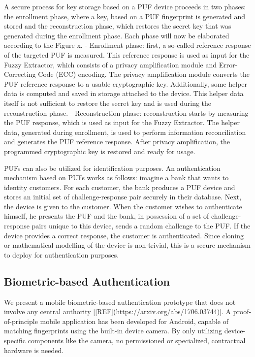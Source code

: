\documentclass[USenglish]{article}
\begin{document}
A secure process for key storage based on a PUF device proceeds in two phases: the enrollment phase, where a key, based on a PUF fingerprint is generated and stored and the reconstruction phase, which restores the secret key that was generated during the enrollment phase.
Each phase will now be elaborated according to the Figure x.
- Enrollment phase: first, a so-called reference response of the targeted PUF is measured. This reference response is used as input for the Fuzzy Extractor, which consists of a privacy amplification module and Error-Correcting Code (ECC) encoding. The privacy amplification module converts the PUF reference response to a usable cryptographic key. Additionally, some helper data is computed and saved in storage attached to the device. This helper data itself is not sufficient to restore the secret key and is used during the reconstruction phase.
- Reconstruction phase: reconstruction starts by measuring the PUF response, which is used as input for the Fuzzy Extractor. The helper data, generated during enrollment, is used to perform information reconciliation and generates the PUF reference response. After privacy amplification, the programmed cryptographic key is restored and ready for usage.

PUFs can also be utilized for identification purposes.
An authentication mechanism based on PUFs works as follows: imagine a bank that wants to identity customers.
For each customer, the bank produces a PUF device and stores an initial set of challenge-response pair securely in their database.
Next, the device is given to the customer.
When the customer wishes to authenticate himself, he presents the PUF and the bank, in possession of a set of challenge-response pairs unique to this device, sends a random challenge to the PUF.
If the device provides a correct response, the customer is authenticated.
Since cloning or mathematical modelling of the device is non-trivial, this is a secure mechanism to deploy for authentication purposes.

\subsection{Biometric-based Authentication}

We present a mobile biometric-based authentication prototype that does not involve any central authority [[REF](https://arxiv.org/abs/1706.03744)].
A proof-of-principle mobile application has been developed for Android, capable of matching fingerprints using the built-in device camera.
By only utilizing device-specific components like the camera, no permissioned or specialized, contractual hardware is needed.
\end{document}
